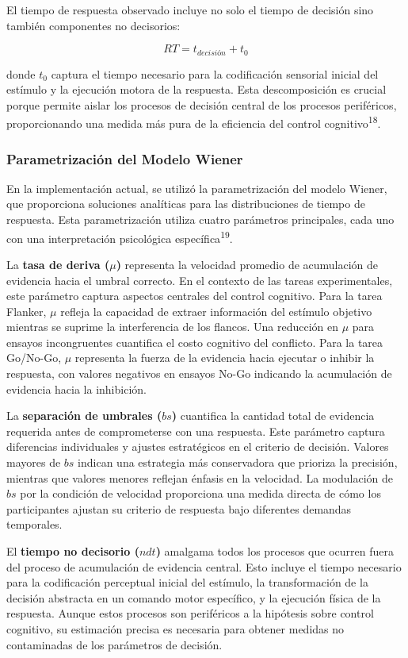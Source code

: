 \documentclass[
  spanish,
  10pt,
]{article}
\begin{document}
El tiempo de respuesta observado incluye no solo el tiempo de decisión
sino también componentes no decisorios:

\[RT = t_{decisión} + t_0\]

donde \(t_0\) captura el tiempo necesario para la codificación sensorial
inicial del estímulo y la ejecución motora de la respuesta. Esta
descomposición es crucial porque permite aislar los procesos de decisión
central de los procesos periféricos, proporcionando una medida más pura
de la eficiencia del control cognitivo\textsuperscript{18}.

\subsubsection{Parametrización del Modelo
Wiener}\label{parametrizaciuxf3n-del-modelo-wiener}

En la implementación actual, se utilizó la parametrización del modelo
Wiener, que proporciona soluciones analíticas para las distribuciones de
tiempo de respuesta. Esta parametrización utiliza cuatro parámetros
principales, cada uno con una interpretación psicológica
específica\textsuperscript{19}.

La \textbf{tasa de deriva (\(\mu\))} representa la velocidad promedio de
acumulación de evidencia hacia el umbral correcto. En el contexto de las
tareas experimentales, este parámetro captura aspectos centrales del
control cognitivo. Para la tarea Flanker, \(\mu\) refleja la capacidad
de extraer información del estímulo objetivo mientras se suprime la
interferencia de los flancos. Una reducción en \(\mu\) para ensayos
incongruentes cuantifica el costo cognitivo del conflicto. Para la tarea
Go/No-Go, \(\mu\) representa la fuerza de la evidencia hacia ejecutar o
inhibir la respuesta, con valores negativos en ensayos No-Go indicando
la acumulación de evidencia hacia la inhibición.

La \textbf{separación de umbrales (\(bs\))} cuantifica la cantidad total
de evidencia requerida antes de comprometerse con una respuesta. Este
parámetro captura diferencias individuales y ajustes estratégicos en el
criterio de decisión. Valores mayores de \(bs\) indican una estrategia
más conservadora que prioriza la precisión, mientras que valores menores
reflejan énfasis en la velocidad. La modulación de \(bs\) por la
condición de velocidad proporciona una medida directa de cómo los
participantes ajustan su criterio de respuesta bajo diferentes demandas
temporales.

El \textbf{tiempo no decisorio (\(ndt\))} amalgama todos los procesos
que ocurren fuera del proceso de acumulación de evidencia central. Esto
incluye el tiempo necesario para la codificación perceptual inicial del
estímulo, la transformación de la decisión abstracta en un comando motor
específico, y la ejecución física de la respuesta. Aunque estos procesos
son periféricos a la hipótesis sobre control cognitivo, su estimación
precisa es necesaria para obtener medidas no contaminadas de los
parámetros de decisión.
\end{document}
